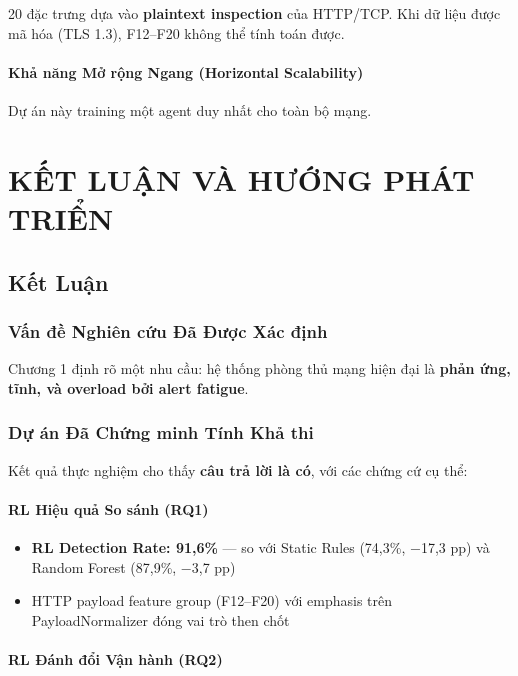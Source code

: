 \documentclass[12pt,a4paper,twoside]{report}
\begin{document}
20 đặc trưng dựa vào \textbf{plaintext inspection} của HTTP/TCP. Khi dữ liệu được mã hóa (TLS 1.3), F12--F20 không thể tính toán được.

\subsubsection{Khả năng Mở rộng Ngang (Horizontal Scalability)}

Dự án này training một agent duy nhất cho toàn bộ mạng.

\chapter{KẾT LUẬN VÀ HƯỚNG PHÁT TRIỂN}

\section{Kết Luận}

\subsection{Vấn đề Nghiên cứu Đã Được Xác định}

Chương 1 định rõ một nhu cầu: hệ thống phòng thủ mạng hiện đại là \textbf{phản ứng, tĩnh, và overload bởi alert fatigue}.

\subsection{Dự án Đã Chứng minh Tính Khả thi}

Kết quả thực nghiệm cho thấy \textbf{câu trả lời là có}, với các chứng cứ cụ thể:

\subsubsection{RL Hiệu quả So sánh (RQ1)}

\begin{itemize}
\item \textbf{RL Detection Rate: 91,6\%} --- so với Static Rules (74,3\%, $-$17,3 pp) và Random Forest (87,9\%, $-$3,7 pp)
\item HTTP payload feature group (F12--F20) với emphasis trên PayloadNormalizer đóng vai trò then chốt
\end{itemize}

\subsubsection{RL Đánh đổi Vận hành (RQ2)}
\end{document}
